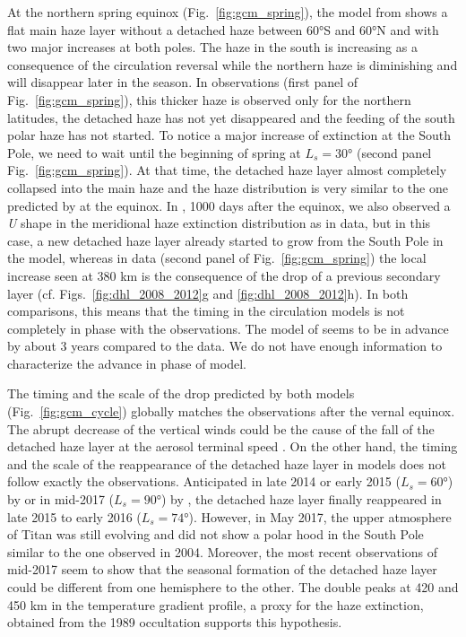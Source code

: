 At the northern spring equinox (Fig.~\ref{fig:gcm_spring}), the model from \cite{Lebonnois2012} shows a
flat main haze layer without a detached haze between \ang{60}S and \ang{60}N and with two major increases at both poles. The
haze in the south is increasing as a consequence of the circulation reversal while the northern haze is diminishing
and will disappear later in the season. In observations (first panel of Fig.~\ref{fig:gcm_spring}),
this thicker haze is observed only for the northern latitudes, the detached haze has not yet disappeared
and the feeding of the south polar haze has not started. To notice a major increase of extinction at the South Pole,
we need to wait until the beginning of spring at $L_s = \ang{30}$ (second panel Fig.~\ref{fig:gcm_spring}).
At that time, the detached haze layer almost completely collapsed into the main haze and the haze distribution is very
similar to the one predicted by \cite{Lebonnois2012} at the equinox. In \cite{Larson2015}, 1000 days after the equinox,
we also observed a \emph{U} shape in the meridional haze extinction distribution as in data, but in this case, a new detached haze layer already
started to grow from the South Pole in the model, whereas in data (second panel  of Fig.~\ref{fig:gcm_spring}) the local
increase seen at 380 km is the consequence of the drop of a previous secondary layer (cf. Figs.~\ref{fig:dhl_2008_2012}g
and \ref{fig:dhl_2008_2012}h). In both comparisons, this means that the timing in the circulation models is not completely in
phase with the observations. The model of \cite{Lebonnois2012} seems to be in advance by about 3 years compared to the data.
We do not have enough information to characterize the advance in phase of \cite{Larson2015} model.

The timing and the scale of the drop predicted by both models (Fig.~\ref{fig:gcm_cycle}) globally matches
the observations after the vernal equinox. The abrupt decrease of the vertical winds could be the cause of the fall of
the detached haze layer at the aerosol terminal speed \citep{West2018}. On the other hand, the timing and the scale of the reappearance
of the detached haze layer in models does not follow exactly the observations. Anticipated in late 2014 or early 2015
($L_s = \ang{60}$) by \cite{Larson2015} or in mid-2017 ($L_s = \ang{90}$) by \cite{Lebonnois2012}, the detached haze layer
finally reappeared in late 2015 to early 2016 ($L_s = \ang{74}$).
However, in May 2017, the upper atmosphere of Titan was still evolving and did not show a polar hood in the South Pole
similar to the one observed in 2004. Moreover, the most recent observations of mid-2017 seem to show that the seasonal
formation of the detached haze layer could be different from one hemisphere to the other. The double peaks at
420 and 450 km in the temperature gradient profile, a proxy for the haze extinction, obtained from the 1989
occultation \citep{Sicardy1999} supports this hypothesis.

